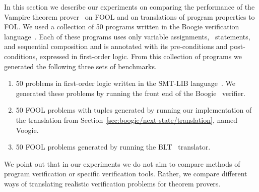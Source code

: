 In this section we describe our experiments on comparing the performance of the Vampire theorem prover~\cite{Vampire13} on FOOL and on translations of program properties to FOL. We used a collection of 50 programs written in the Boogie verification language~\cite{leino2008boogie}. Each of these programs uses only variable assignments, \ITE\ statements, and sequential composition and is annotated with its pre-conditions and post-conditions, expressed in first-order logic. From this collection of programs we generated the following three sets of benchmarks.



\begin{enumerate}
  \item 50 problems in first-order logic written in the SMT-LIB language~\cite{SMT-LIB}. We generated these problems by running the front end of the Boogie~\cite{DBLP:conf/fmco/BarnettCDJL05} verifier.
  \item 50 FOOL problems with tuples generated by running our implementation of the translation from Section~\ref{sec:boogie/next-state/translation}, named Voogie.
  \item 50 FOOL problems generated by running the BLT~\cite{CF-iFM17} translator.
\end{enumerate}

We point out that in our experiments we do not aim to compare methods of program verification or specific verification tools. Rather, we compare different ways of translating realistic verification problems for theorem provers.

